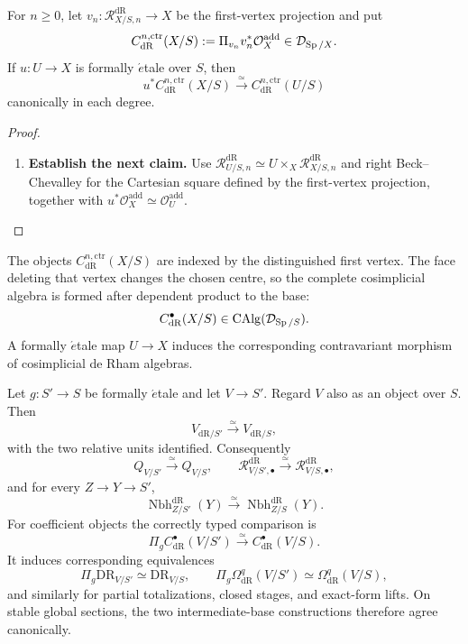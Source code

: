 \begin{proposition}
\label{prop:centered-degreewise-etale-base-change}
For \(n\geq0\), let \(v_n:\mathcal R^{\mathrm{dR}}_{X/S,n}\to X\) be the first-vertex projection and
put
\[
  C^{n,\mathrm{ctr}}_{\mathrm{dR}}(X/S)
  :=
  \Pi_{v_n}v_n^*\mathcal O_X^{\mathrm{add}}
  \in\mathcal D_{\operatorname{Sp}/X}.
\]
If \(u:U\to X\) is formally \(\acute{e}\)tale over \(S\), then
\[
  u^*C^{n,\mathrm{ctr}}_{\mathrm{dR}}(X/S)
  \xrightarrow{\simeq}
  C^{n,\mathrm{ctr}}_{\mathrm{dR}}(U/S)
\]
canonically in each degree.
\end{proposition}

\begin{proof}
\leavevmode
\begin{enumerate}[label=\textup{(\arabic*)}]
    \item \textbf{Establish the next claim.}
    Use
    \(\mathcal R^{\mathrm{dR}}_{U/S,n}\simeq
    U\times_X\mathcal R^{\mathrm{dR}}_{X/S,n}\) and right Beck--Chevalley for
    the Cartesian square defined by the first-vertex projection, together with
    \(u^*\mathcal O_X^{\mathrm{add}}\simeq\mathcal O_U^{\mathrm{add}}\).
\end{enumerate}
\end{proof}

\begin{remark}
The objects \(C^{n,\mathrm{ctr}}_{\mathrm{dR}}(X/S)\) are indexed by the distinguished first
vertex. The face deleting that vertex changes the chosen centre, so the complete
cosimplicial algebra is formed after dependent product to the base:
\[
  C^\bullet_{\mathrm{dR}}(X/S)\in\operatorname{CAlg}(\mathcal D_{\operatorname{Sp}/S}).
\]
A formally \(\acute{e}\)tale map \(U\to X\) induces the corresponding
contravariant morphism of cosimplicial de Rham algebras.
\end{remark}

\begin{theorem}
\label{thm:formal-etale-intermediate-base}
Let \(g:S'\to S\) be formally \(\acute{e}\)tale and let \(V\to S'\). Regard
\(V\) also as an object over \(S\). Then
\[
  V_{\mathrm{dR}/S'}
  \xrightarrow{\simeq}
  V_{\mathrm{dR}/S},
\]
with the two relative units identified. Consequently
\[
  Q_{V/S'}\xrightarrow{\simeq}Q_{V/S},
  \qquad
  \mathcal R^{\mathrm{dR}}_{V/S',\bullet}\xrightarrow{\simeq}\mathcal R^{\mathrm{dR}}_{V/S,\bullet},
\]
and for every \(Z\to Y\to S'\),
\[
  \operatorname{Nbh}^{\mathrm{dR}}_{Z/S'}(Y)
  \xrightarrow{\simeq}
  \operatorname{Nbh}^{\mathrm{dR}}_{Z/S}(Y).
\]
For coefficient objects the correctly typed comparison is
\[
  \Pi_g C^\bullet_{\mathrm{dR}}(V/S')
  \xrightarrow{\simeq}
  C^\bullet_{\mathrm{dR}}(V/S).
\]
It induces corresponding equivalences
\[
  \Pi_g\mathrm{DR}_{V/S'}
  \simeq
  \mathrm{DR}_{V/S},
  \qquad
  \Pi_g\Omega^q_{\mathrm{dR}}(V/S')
  \simeq
  \Omega^q_{\mathrm{dR}}(V/S),
\]
and similarly for partial totalizations, closed stages, and exact-form lifts.
On stable global sections, the two intermediate-base constructions therefore agree
canonically.
\end{theorem}

